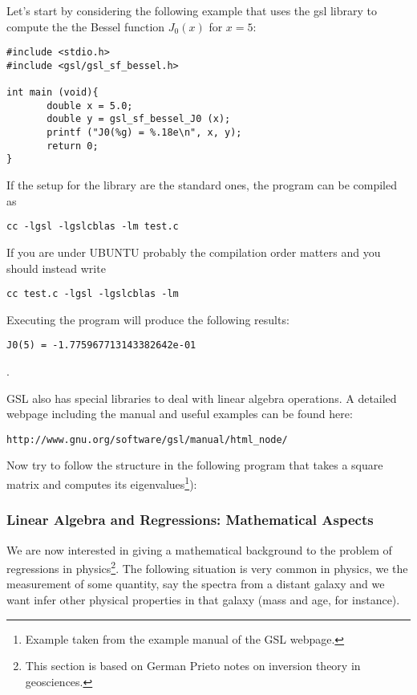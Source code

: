 \documentclass{article}
\begin{document}
Let's start by considering the following example that uses the gsl library to compute the the Bessel function $J_{0}(x)$ for $x=5$:

\begin{verbatim}
#include <stdio.h>
#include <gsl/gsl_sf_bessel.h>
     
int main (void){
       double x = 5.0;
       double y = gsl_sf_bessel_J0 (x);
       printf ("J0(%g) = %.18e\n", x, y);
       return 0;
}
\end{verbatim}

If the setup for the library are the standard ones, the program can be compiled as

\begin{verbatim}
cc -lgsl -lgslcblas -lm test.c 
\end{verbatim}



If you are under UBUNTU probably the compilation order matters and you should instead write

\begin{verbatim}
cc test.c -lgsl -lgslcblas -lm 
\end{verbatim}

Executing the program will produce the following results:

\begin{verbatim}
J0(5) = -1.775967713143382642e-01
\end{verbatim}.


GSL also has special libraries to deal with linear algebra operations. A detailed webpage including the manual and useful examples can be found here:

\begin{verbatim}
http://www.gnu.org/software/gsl/manual/html_node/
\end{verbatim}

Now try to follow the structure in the following program that takes a square matrix and computes its eigenvalues\footnote{Example taken from the example manual of the GSL webpage.}):




\subsubsection{Linear Algebra and Regressions: Mathematical Aspects}

We are now interested in giving a mathematical background to the problem of regressions in physics\footnote{This section is based on German Prieto notes on inversion theory in geosciences.}. 
The following situation is very common in physics, we the measurement of some quantity, say the spectra from a distant galaxy and we want infer other physical properties in that galaxy (mass and age, for instance).
\end{document}
